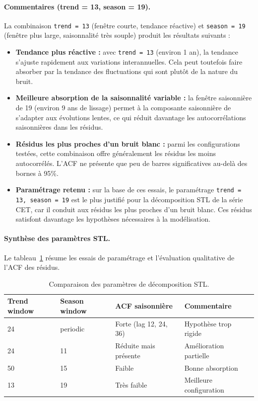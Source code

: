 \documentclass[12pt,a4paper]{article}
\begin{document}
\paragraph{Commentaires (trend = 13, season = 19).}
La combinaison \texttt{trend = 13} (fenêtre courte, tendance réactive) et \texttt{season = 19} (fenêtre plus large, saisonnalité très souple) produit les résultats suivants :
\begin{itemize}
    \item \textbf{Tendance plus réactive :} avec \texttt{trend = 13} (environ 1 an), la tendance s'ajuste rapidement aux variations interannuelles. Cela peut toutefois faire absorber par la tendance des fluctuations qui sont plutôt de la nature du bruit.
    \item \textbf{Meilleure absorption de la saisonnalité variable :} la fenêtre saisonnière de 19 (environ 9 ans de lissage) permet à la composante saisonnière de s'adapter aux évolutions lentes, ce qui réduit davantage les autocorrélations saisonnières dans les résidus.
    \item \textbf{Résidus les plus proches d'un bruit blanc :} parmi les configurations testées, cette combinaison offre généralement les résidus les moins autocorrélés. L'ACF ne présente que peu de barres significatives au-delà des bornes à 95\%.
    \item \textbf{Paramétrage retenu :} sur la base de ces essais, le paramétrage \texttt{trend = 13, season = 19} est le plus justifié pour la décomposition STL de la série CET, car il conduit aux résidus les plus proches d'un bruit blanc. Ces résidus satisfont davantage les hypothèses nécessaires à la modélisation.
\end{itemize}

\paragraph{Synthèse des paramètres STL.}
Le tableau~\ref{tab:stl_params} résume les essais de paramétrage et l'évaluation qualitative de l'ACF des résidus.

\begin{table}[H]
\centering
\caption{Comparaison des paramètres de décomposition STL.}
\label{tab:stl_params}
\begin{tabular}{@{}lllp{6cm}@{}}
\toprule
Trend window & Season window & ACF saisonnière & Commentaire \\
\midrule
24  & periodic & Forte (lag 12, 24, 36) & Hypothèse trop rigide \\
24  & 11 & Réduite mais présente & Amélioration partielle \\
50  & 15 & Faible  & Bonne absorption \\
13  & 19 & Très faible & Meilleure configuration \\
\bottomrule
\end{tabular}
\end{table}
\end{document}
